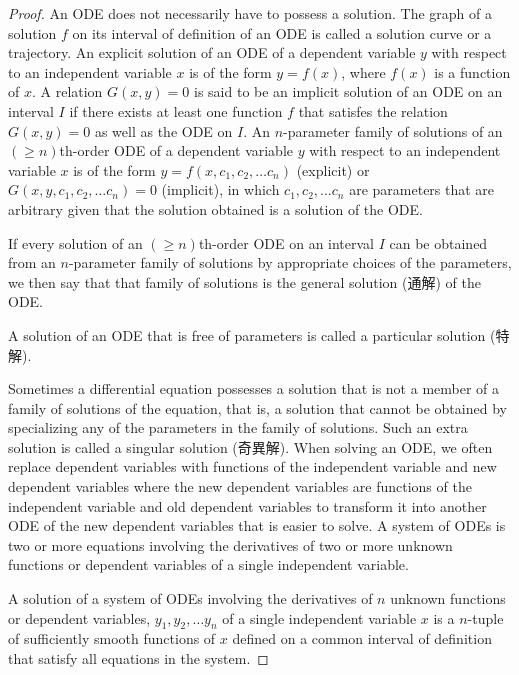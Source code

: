\documentclass[a4paper,12pt]{report}
\begin{document}
\begin{itemize}
\begin{itemize}
\begin{proof}
An ODE does not necessarily have to possess a solution.
The graph of a solution $f$ on its interval of definition of an ODE is called a solution curve or a trajectory.
An explicit solution of an ODE of a dependent variable $y$ with respect to an independent variable $x$ is of the form $y=f(x)$, where $f(x)$ is a function of $x$.
A relation $G(x, y) = 0$ is said to be an implicit solution of an ODE on an interval $I$ if there exists at least one function $f$ that satisfes the relation $G(x, y) = 0$ as well as the ODE on $I$.
An $n$-parameter family of solutions of an $(\geq n)$th-order ODE of a dependent variable $y$ with respect to an independent variable $x$ is of the form $y=f(x,c_1,c_2,\dots c_n)$ (explicit) or $G(x,y,c_1,c_2,\dots c_n)=0$ (implicit), in which $c_1,c_2,\dots c_n$ are parameters that are arbitrary given that the solution obtained is a solution of the ODE.

If every solution of an $(\geq n)$th-order ODE on an interval $I$ can be obtained from an $n$-parameter family of solutions by appropriate choices of the parameters, we then say that that family of solutions is the general solution (通解) of the ODE.

A solution of an ODE that is free of parameters is called a particular solution (特解).

Sometimes a differential equation possesses a solution that is not a member of a family of solutions of the equation, that is, a solution that cannot be obtained by specializing any of the parameters in the family of solutions. Such an extra solution is called a singular solution (奇異解).
When solving an ODE, we often replace dependent variables with functions of the independent variable and new dependent variables where the new dependent variables are functions of the independent variable and old dependent variables to transform it into another ODE of the new dependent variables that is easier to solve.
A system of ODEs is two or more equations involving the derivatives of two or more unknown functions or dependent variables of a single independent variable.

A solution of a system of ODEs involving the derivatives of $n$ unknown functions or dependent variables, $y_1,y_2,\dots y_n$ of a single independent variable $x$ is a $n$-tuple of sufficiently smooth functions of $x$ defined on a common interval of definition that satisfy all equations in the system.


\end{proof}
\end{itemize}
\end{itemize}
\end{document}
